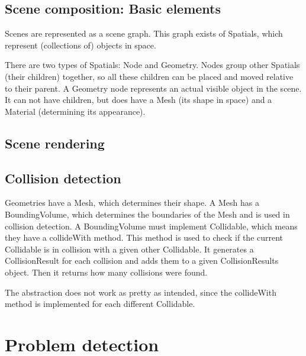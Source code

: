 \documentclass[a4paper, 10pt]{article}
\begin{document}

\subsection{Scene composition: Basic elements}
\label{sec:scene_composition}
Scenes are represented as a scene graph.
This graph exists of Spatials, which represent (collections of) objects in space. 

There are two types of Spatials: Node and Geometry.
Nodes group other Spatials (their children) together, 
so all these children can be placed and moved relative to their parent.
A Geometry node represents an actual visible object in the scene.
It can not have children, but does have a Mesh (its shape in space) 
and a Material (determining its appearance).

\subsection{Scene rendering}
\label{sec:scene_rendering}


\subsection{Collision detection}
\label{sec:collision_detection}
Geometries have a Mesh, which determines their shape.
A Mesh has a BoundingVolume, which determines the
boundaries of the Mesh and is used in collision detection.
A BoundingVolume must implement Collidable,
which means they have a collideWith method.
This method is used to check if the current Collidable
is in collision with a given other Collidable.
It generates a CollisionResult for each collision and adds
them to a given CollisionResults object.
Then it returns how many collisions were found.

The abstraction does not work as pretty as intended,
since the collideWith method is implemented
for each different Collidable.


\newpage
\section{Problem detection}
\label{sec:problem_detection}
\end{document}
